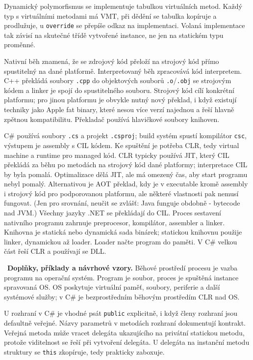 \begin{odpoved}
Dynamický polymorfismus se implementuje tabulkou virtuálních metod. Každý typ s
virtuálními metodami má VMT, při dědění se tabulka kopíruje a prodlužuje, u
\texttt{override} se přepíše odkaz na implementaci. Volaná implementace tak závisí na
skutečné třídě vytvořené instance, ne jen na statickém typu proměnné.

Nativní běh znamená, že se zdrojový kód přeloží na strojový kód přímo spustitelný na
dané platformě. Interpretovaný běh zpracovává kód interpretem. C++ překládá soubory
\texttt{.cpp} do objektových souborů \texttt{.o}/\texttt{.obj} se strojovým kódem a
linker je spojí do spustitelného souboru. Strojový kód cílí konkrétní platformu; pro
jinou platformu je obvykle nutný nový překlad, i když existují techniky jako Apple fat
binary, které nesou více verzí najednou a řeší hlavně zpětnou kompatibilitu. Překladač
používá hlavičkové soubory knihoven.

C\# používá soubory \texttt{.cs} a projekt \texttt{.csproj}; build systém spustí
kompilátor \texttt{csc}, výstupem je assembly s CIL kódem. Ke spuštění je potřeba CLR,
tedy virtual machine a runtime pro managed kód. CLR typicky používá JIT, který CIL
překládá za běhu po metodách na strojový kód dané platformy; interpretace CIL by byla
pomalá. Optimalizace dělá JIT, ale má omezený čas, aby start programu nebyl pomalý.
Alternativou je AOT překlad, kdy je v executable kromě assembly i strojový kód pro
podporovanou platformu, ale některé vlastnosti pak nemusí fungovat. (Jen pro srovnání,
neučit se zvlášť: Java funguje obdobně - bytecode nad JVM.) Všechny jazyky .NET se
překládají do CIL. Proces sestavení nativního programu zahrnuje preprocesor, kompilátor, assembler a
linker. Knihovna je statická nebo dynamická sada binárek; statickou knihovnu použije
linker, dynamickou až loader. Loader načte program do paměti. V C\# velkou část řeší CLR
a používají se DLL.

\noindent{}\ \textbf{Doplňky, příklady a návrhové vzory.}
Běhové prostředí procesu je vazba programu na operační systém. Program je soubor, proces
je spuštěná instance spravovaná OS. OS poskytuje virtuální paměť, soubory, periferie a
další systémové služby; v C\# je bezprostředním běhovým prostředím CLR nad OS.

U rozhraní v C\# je vhodné psát \texttt{public} explicitně, i když členy rozhraní jsou
defaultně veřejné. Názvy parametrů v metodách rozhraní dokumentují kontrakt. Veřejná
metoda může vracet delegáta ukazujícího na privátní statickou metodu, protože viditelnost
se řeší při vytvoření delegáta. U delegáta na instanční metodu struktury se \texttt{this}
zkopíruje, tedy prakticky zaboxuje.


\end{odpoved}
